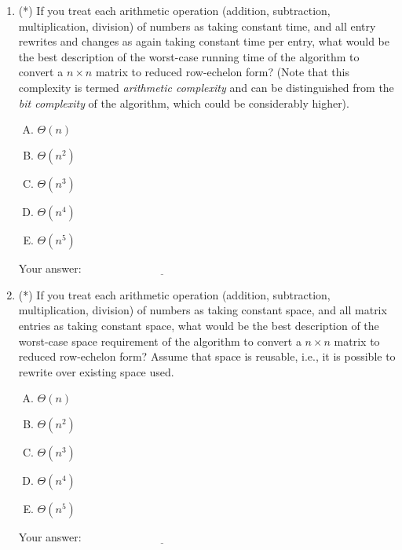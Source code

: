 \documentclass[10pt]{amsart}
\begin{document}
\begin{enumerate}
\item (*) If you treat each arithmetic operation (addition,
  subtraction, multiplication, division) of numbers as taking constant
  time, and all entry rewrites and changes as again taking constant
  time per entry, what would be the best description of the worst-case
  running time of the algorithm to convert a $n \times n$ matrix to
  reduced row-echelon form? (Note that this complexity is termed {\em
    arithmetic complexity} and can be distinguished from the {\em bit
    complexity} of the algorithm, which could be considerably
  higher).

  \begin{enumerate}[(A)]
  \item $\Theta(n)$
  \item $\Theta(n^2)$
  \item $\Theta(n^3)$
  \item $\Theta(n^4)$
  \item $\Theta(n^5)$
  \end{enumerate}

  \vspace{0.1in}
  Your answer: $\underline{\qquad\qquad\qquad\qquad\qquad\qquad\qquad}$
  \vspace{0.1in}

\item (*) If you treat each arithmetic operation (addition,
  subtraction, multiplication, division) of numbers as taking constant
  space, and all matrix entries as taking constant space, what would
  be the best description of the worst-case space requirement of the
  algorithm to convert a $n \times n$ matrix to reduced row-echelon
  form? Assume that space is reusable, i.e., it is possible to rewrite
  over existing space used.

  \begin{enumerate}[(A)]
  \item $\Theta(n)$
  \item $\Theta(n^2)$
  \item $\Theta(n^3)$
  \item $\Theta(n^4)$
  \item $\Theta(n^5)$
  \end{enumerate}

  \vspace{0.1in}
  Your answer: $\underline{\qquad\qquad\qquad\qquad\qquad\qquad\qquad}$
  \vspace{0.1in}


\end{enumerate}
\end{document}
